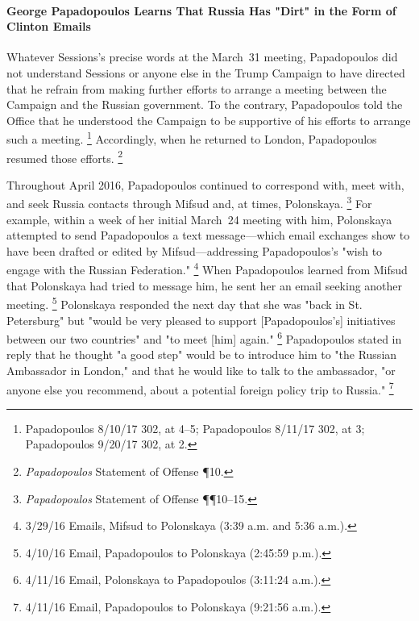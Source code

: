 \paragraph{George Papadopoulos Learns That Russia Has "Dirt" in the Form of Clinton Emails}

Whatever Sessions's precise words at the March~31 meeting, Papadopoulos did not understand Sessions or anyone else in the Trump Campaign to have directed that he refrain from making further efforts to arrange a meeting between the Campaign and the Russian government.
To the contrary, Papadopoulos told the Office that he understood the Campaign to be supportive of his efforts to arrange such a meeting.%
\footnote{Papadopoulos 8/10/17 302, at 4--5; Papadopoulos 8/11/17 302, at 3; Papadopoulos 9/20/17 302, at 2.}
Accordingly, when he returned to London, Papadopoulos resumed those efforts.%
\footnote{\textit{Papadopoulos} Statement of Offense \P 10.}

Throughout April 2016, Papadopoulos continued to correspond with, meet with, and seek Russia contacts through Mifsud and, at times, Polonskaya.%
\footnote{\textit{Papadopoulos} Statement of Offense \P\P 10--15.}
For example, within a week of her initial March~24 meeting with him, Polonskaya attempted to send Papadopoulos a text message---which email exchanges show to have been drafted or edited by Mifsud---addressing Papadopoulos's "wish to engage with the Russian Federation."%
\footnote{3/29/16 Emails, Mifsud to Polonskaya (3:39 a.m. and 5:36 a.m.).}
When Papadopoulos learned from Mifsud that Polonskaya had tried to message him, he sent her an email seeking another meeting.%
\footnote{4/10/16 Email, Papadopoulos to Polonskaya (2:45:59 p.m.).}
Polonskaya responded the next day that she was "back in St. Petersburg" but "would be very pleased to support [Papadopoulos's] initiatives between our two countries" and "to meet [him] again."%
\footnote{4/11/16 Email, Polonskaya to Papadopoulos (3:11:24 a.m.).}
Papadopoulos stated in reply that he thought "a good step" would be to introduce him to "the Russian Ambassador in London," and that he would like to talk to the ambassador, "or anyone else you recommend, about a potential foreign policy trip to Russia."%
\footnote{4/11/16 Email, Papadopoulos to Polonskaya (9:21:56 a.m.).}


